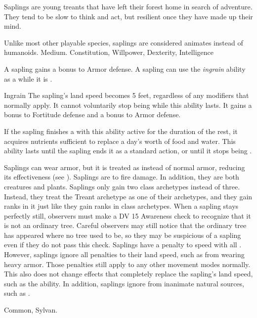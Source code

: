         Saplings are young treants that have left their forest home in search of adventure.
        They tend to be slow to think and act, but resilient once they have made up their mind.

         Unlike most other playable species, saplings are considered animates instead of humanoids.
         Medium.
          Constitution,  Willpower,  Dexterity,  Intelligence
        \begin{itemize}
             A sapling gains a  bonus to Armor defense.
             A sapling can use the \textit{ingrain} ability as a  while it is .
                \begin{activeability}{Ingrain}
                    \rankline
                    The sapling's land speed becomes 5 feet, regardless of any modifiers that normally apply.
                    It cannot voluntarily stop being  while this ability lasts.
                    It gains a  bonus to Fortitude defense and a  bonus to Armor defense.

                    If the sapling finishes a  with this ability active for the duration of the rest, it acquires nutrients sufficient to replace a day's worth of food and water.
                    This ability lasts until the sapling ends it as a standard action, or until it stops being .
                \end{activeability}
             Saplings can wear armor, but it is treated as  instead of normal armor, reducing its effectiveness (see ).
             Saplings are \vulnerable to fire damage. In addition, they are both creatures and plants.
             Saplings only gain two class archetypes instead of three.
                Instead, they treat the Treant archetype as one of their archetypes, and they gain ranks in it just like they gain ranks in class archetypes.
             When a sapling stays perfectly still, observers must make a DV 15 Awareness check to recognize that it is not an ordinary tree.
            Careful observers may still notice that the ordinary tree has appeared where no tree used to be, so they may be suspicious of a sapling even if they do not pass this check.
             Saplings have a  penalty to speed with all .
                However, saplings ignore all penalties to their land speed, such as from wearing heavy armor.
                Those penalties still apply to any other movement modes normally.
                This also does not change effects that completely replace the sapling's land speed, such as the  ability.
                In addition, saplings ignore  from inanimate natural sources, such as .
        \end{itemize}
         Common, Sylvan.

